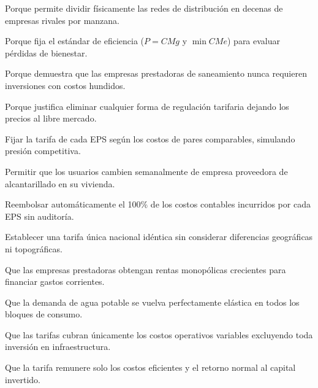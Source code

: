 \begin{opts}
    \item Porque permite dividir físicamente las redes de distribución en decenas de empresas rivales por manzana.
    \item Porque fija el estándar de eficiencia ($P = CMg$ y $\min CMe$) para evaluar pérdidas de bienestar.
    \item Porque demuestra que las empresas prestadoras de saneamiento nunca requieren inversiones con costos hundidos.
    \item Porque justifica eliminar cualquier forma de regulación tarifaria dejando los precios al libre mercado.
\end{opts}

\begin{opts}
    \item Fijar la tarifa de cada EPS según los costos de pares comparables, simulando presión competitiva.
    \item Permitir que los usuarios cambien semanalmente de empresa proveedora de alcantarillado en su vivienda.
    \item Reembolsar automáticamente el 100\% de los costos contables incurridos por cada EPS sin auditoría.
    \item Establecer una tarifa única nacional idéntica sin considerar diferencias geográficas ni topográficas.
\end{opts}

\begin{opts}
    \item Que las empresas prestadoras obtengan rentas monopólicas crecientes para financiar gastos corrientes.
    \item Que la demanda de agua potable se vuelva perfectamente elástica en todos los bloques de consumo.
    \item Que las tarifas cubran únicamente los costos operativos variables excluyendo toda inversión en infraestructura.
    \item Que la tarifa remunere solo los costos eficientes y el retorno normal al capital invertido.
\end{opts}

